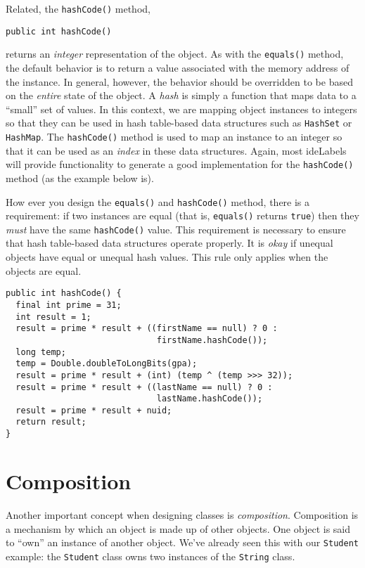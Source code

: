 Related, the \texttt{hashCode()} method, 

\texttt{public int hashCode()}

returns an \emph{integer} representation of the object.  As with
the \texttt{equals()} method, the default behavior is
to return a value associated with the memory address of the instance.
In general, however, the behavior should be overridden to be based
on the \emph{entire} state of the object.  A \emph{hash} is simply
a function that maps data to a ``small'' set of values.  In this
context, we are mapping object instances to integers so that they
can be used in hash table-based data structures such as 
\texttt{HashSet} or \texttt{HashMap}.  The
\texttt{hashCode()} method is used to map an instance
to an integer so that it can be used as an \emph{index} in these
data structures.  Again, most \glspl{ideLabel} will provide
functionality to generate a good implementation for the 
\texttt{hashCode()} method (as the example below is).

How ever you design the \texttt{equals()} and 
\texttt{hashCode()} method, there is a requirement:
if two instances are equal (that is, \texttt{equals()}
returns \texttt{true}) then they \emph{must} have
the same \texttt{hashCode()} value.  This requirement
is necessary to ensure that hash table-based data structures
operate properly.  It is \emph{okay} if unequal objects
have equal or unequal hash values.  This rule only applies when
the objects are equal.  

\begin{verbatim}
public int hashCode() {
  final int prime = 31;
  int result = 1;
  result = prime * result + ((firstName == null) ? 0 : 
                              firstName.hashCode());
  long temp;
  temp = Double.doubleToLongBits(gpa);
  result = prime * result + (int) (temp ^ (temp >>> 32));
  result = prime * result + ((lastName == null) ? 0 : 
                              lastName.hashCode());
  result = prime * result + nuid;
  return result;
}
\end{verbatim}

\section{Composition}

Another important concept when designing classes is \emph{composition}.
Composition is a mechanism by which an object is made up of other objects.
One object is said to ``own'' an instance of another object.  We've
already seen this with our \texttt{Student} example: the
\texttt{Student} class owns two instances of the
\texttt{String} class.  

